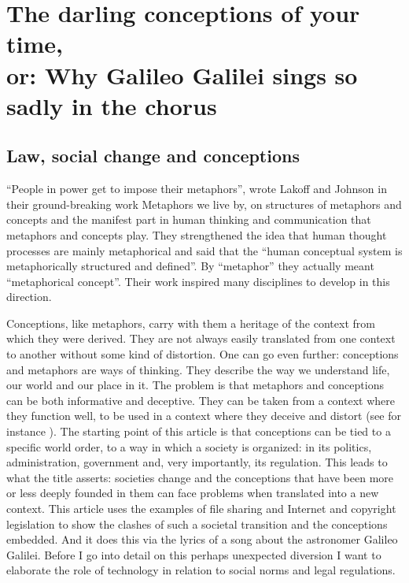 \begin{savequote}
\end{savequote}
\chapter[The darling conceptions of your time]{The darling conceptions of your
time,\\ \Large{or: Why Galileo Galilei sings so sadly in the chorus}}
\label{c:darling_conceptions}


\section{Law, social change and conceptions}
\label{s:darling_conceptions:law_social_change_concetions}

``People in power get to impose their metaphors'', wrote Lakof\hbox{}f and Johnson in
their ground-breaking work Metaphors we live by, on structures of metaphors and
concepts and the manifest part in human thinking and communication that
metaphors and concepts play. They strengthened the idea that human thought
processes are mainly metaphorical and said that the ``human conceptual system is
metaphorically structured and def\hbox{}ined''. By ``metaphor'' they actually meant
``metaphorical concept''\cite{darling-lakoff_johnson80}. Their work inspired
many disciplines to develop in this direction. 

Conceptions, like metaphors, carry with them a heritage of the context from
which they were derived. They are not always easily translated from one context
to another without some kind of distortion. One can go even further: conceptions
and metaphors are ways of thinking. They describe the way we understand life,
our world and our place in it. The problem is that metaphors and conceptions can
be both informative and deceptive. They can be taken from a context where they
function well, to be used in a context where they deceive and distort (see for
instance \cite{darling-morgan99}). The starting point of this article is that
conceptions can be tied to a specif\hbox{}ic world order, to a way in which a society
is organized: in its politics, administration, government and, very importantly,
its regulation. This leads to what the title asserts: societies change and the
conceptions that have been more or less deeply founded in them can face problems
when translated into a new context. This article uses the examples of f\hbox{}ile
sharing and Internet and copyright legislation to show the clashes of such a
societal transition and the conceptions embedded. And it does this via the
lyrics of a song about the astronomer Galileo Galilei. Before I go into detail
on this perhaps unexpected diversion I want to elaborate the role of technology
in relation to social norms and legal regulations. 

